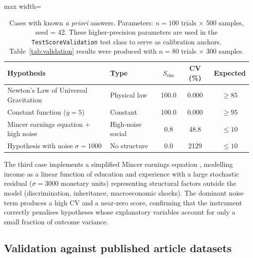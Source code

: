 \documentclass[12pt,a4paper]{article}
\begin{document}
\begin{table}[h!]
\centering
\footnotesize
\begin{adjustbox}{max width=\textwidth}
\begin{tabular}{p{6.5cm}p{3.2cm}ccc}
\toprule
\textbf{Hypothesis} & \textbf{Type} & $S_{\text{sim}}$ & \textbf{CV (\%)} & \textbf{Expected} \\
\midrule
Newton's Law of Universal Gravitation & Physical law & 100.0 & 0.000 & $\geq 85$ \\
Constant function ($y = 5$)           & Constant     & 100.0 & 0.000 & $\geq 95$ \\
Mincer earnings equation + high noise \parencite{mincer1974} & High-noise social & 0.8 & 48.8 & $\leq 10$ \\
Hypothesis with noise $\sigma = 1000$ & No structure & 0.0   & 2129  & $\leq 10$ \\
\bottomrule
\end{tabular}
\end{adjustbox}
\caption{Cases with known \textit{a priori} answers. Parameters: $n = 100$ trials $\times$ 500
samples, seed = 42. These higher-precision parameters are used in the
\texttt{TestScoreValidation} test class to serve as calibration anchors.
Table~\ref{tab:validation} results were produced with $n = 80$ trials $\times$ 300 samples.}
\label{tab:apriori}
\end{table}

The third case implements a simplified Mincer earnings equation
\parencite{mincer1974,becker1964}, modelling income as a linear function of education
and experience with a large stochastic residual ($\sigma = 3000$ monetary units)
representing structural factors outside the model (discrimination, inheritance,
macroeconomic shocks). The dominant noise term produces a high CV and a
near-zero score, confirming that the instrument correctly penalises hypotheses
whose explanatory variables account for only a small fraction of outcome variance.

\subsection{Validation against published article datasets}
\end{document}

